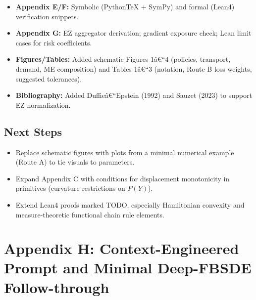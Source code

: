 \documentclass[11pt,letterpaper,oneside]{article}
\numberwithin{equation}{section}
\newcommand{\1}{\mathbf{1}}
\begin{document}
\begin{itemize}[leftmargin=1.15em,itemsep=0.25em]
  \item \textbf{Appendix E/F:} Symbolic (PythonTeX + SymPy) and formal (Lean4) verification snippets.
  \item \textbf{Appendix G:} EZ aggregator derivation; gradient exposure check; Lean limit cases for risk coefficients.
  \item \textbf{Figures/Tables:} Added schematic Figures 1â€“4 (policies, transport, demand, ME composition) and Tables 1â€“3 (notation, Route B loss weights, suggested tolerances).
  \item \textbf{Bibliography:} Added Duffieâ€“Epstein (1992) and Sauzet (2023) to support EZ normalization.
\end{itemize}

\subsection*{Next Steps}
\begin{itemize}[leftmargin=1.15em,itemsep=0.25em]
  \item Replace schematic figures with plots from a minimal numerical example (Route A) to tie visuals to parameters.
  \item Expand Appendix C with conditions for displacement monotonicity in primitives (curvature restrictions on $P(Y)$).
  \item Extend Lean4 proofs marked TODO, especially Hamiltonian convexity and measure-theoretic functional chain rule elements.
\end{itemize}


\section*{Appendix H: Context-Engineered Prompt and Minimal Deep-FBSDE Follow-through}
\end{document}
